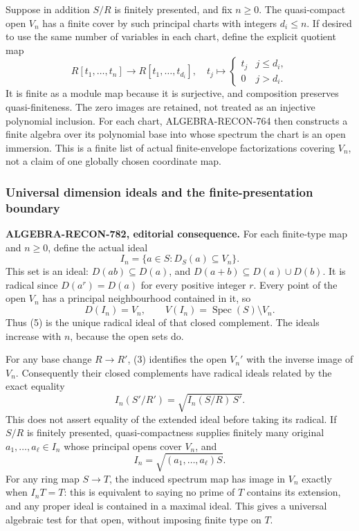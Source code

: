 Suppose in addition \(S/R\) is finitely presented, and fix \(n\geq0\). The quasi-compact open \(V_n\) has a finite cover by such principal charts with integers \(d_i\leq n\). If desired to use the same number of variables in each chart, define the explicit quotient map \[
 R[t_1,\ldots,t_n]\longrightarrow R[t_1,\ldots,t_{d_i}],
 \quad t_j\longmapsto
 \begin{cases}t_j&j\leq d_i,\\0&j>d_i.\end{cases}
\] It is finite as a module map because it is surjective, and composition preserves quasi-finiteness. The zero images are retained, not treated as an injective polynomial inclusion. For each chart, ALGEBRA-\AlgebraIdentifierBreak{}RECON-\AlgebraIdentifierBreak{}764 then constructs a finite algebra over its polynomial base into whose spectrum the chart is an open immersion. This is a finite list of actual finite-envelope factorizations covering \(V_n\), not a claim of one globally chosen coordinate map.

\subsubsection{Universal dimension ideals and the finite-presentation boundary}\label{algebra-proof-034-universal-dimension-ideals-and-the-finite-presentation-boundary}

\textbf{ALGEBRA-\AlgebraIdentifierBreak{}RECON-\AlgebraIdentifierBreak{}782, editorial consequence.} For each finite-type map and \(n\geq0\), define the actual ideal \[
 I_n=\{a\in S:D_S(a)\subseteq V_n\}.
 \tag{5}
\] This set is an ideal: \(D(ab)\subseteq D(a)\), and \(D(a+b)\subseteq D(a)\cup D(b)\). It is radical since \(D(a^r)=D(a)\) for every positive integer \(r\). Every point of the open \(V_n\) has a principal neighbourhood contained in it, so \[
 D(I_n)=V_n,\qquad V(I_n)=\operatorname{Spec}(S)\setminus V_n.
\] Thus (5) is the unique radical ideal of that closed complement. The ideals increase with \(n\), because the open sets do.

For any base change \(R\to R'\), (3) identifies the open \(V_n'\) with the inverse image of \(V_n\). Consequently their closed complements have radical ideals related by the exact equality \[
 I_n(S'/R')=\sqrt{I_n(S/R)\,S'}.
 \tag{6}
\] This does not assert equality of the extended ideal before taking its radical. If \(S/R\) is finitely presented, quasi-compactness supplies finitely many original \(a_1,\ldots,a_\ell\in I_n\) whose principal opens cover \(V_n\), and \[
 I_n=\sqrt{(a_1,\ldots,a_\ell)S}.
\] For any ring map \(S\to T\), the induced spectrum map has image in \(V_n\) exactly when \(I_nT=T\): this is equivalent to saying no prime of \(T\) contains its extension, and any proper ideal is contained in a maximal ideal. This gives a universal algebraic test for that open, without imposing finite type on \(T\).


